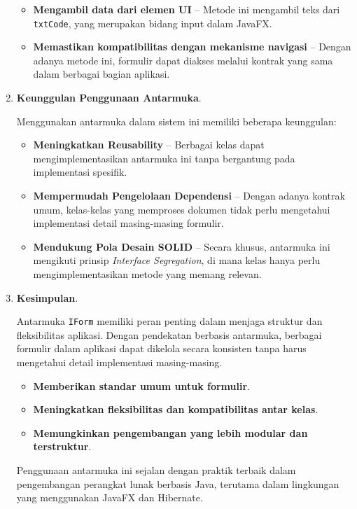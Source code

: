 \begin{enumerate}
	\begin{itemize}
		\item \textbf{Mengambil data dari elemen UI} – Metode ini mengambil teks dari \texttt{txtCode}, yang merupakan bidang input dalam JavaFX.
		\item \textbf{Memastikan kompatibilitas dengan mekanisme navigasi} – Dengan adanya metode ini, formulir dapat diakses melalui kontrak yang sama dalam berbagai bagian aplikasi.
	\end{itemize}
	
	\item \textbf{Keunggulan Penggunaan Antarmuka}.
	
	Menggunakan antarmuka dalam sistem ini memiliki beberapa keunggulan:
	
	\begin{itemize}
		\item \textbf{Meningkatkan Reusability} – Berbagai kelas dapat mengimplementasikan antarmuka ini tanpa bergantung pada implementasi spesifik.
		\item \textbf{Mempermudah Pengelolaan Dependensi} – Dengan adanya kontrak umum, kelas-kelas yang memproses dokumen tidak perlu mengetahui implementasi detail masing-masing formulir.
		\item \textbf{Mendukung Pola Desain SOLID} – Secara khusus, antarmuka ini mengikuti prinsip \textit{Interface Segregation}, di mana kelas hanya perlu mengimplementasikan metode yang memang relevan.
	\end{itemize}
	
	\item \textbf{Kesimpulan}.
	
	Antarmuka \texttt{IForm} memiliki peran penting dalam menjaga struktur dan fleksibilitas aplikasi. Dengan pendekatan berbasis antarmuka, berbagai formulir dalam aplikasi dapat dikelola secara konsisten tanpa harus mengetahui detail implementasi masing-masing.
	
	\begin{itemize}
		\item \textbf{Memberikan standar umum untuk formulir}.
		\item \textbf{Meningkatkan fleksibilitas dan kompatibilitas antar kelas}.
		\item \textbf{Memungkinkan pengembangan yang lebih modular dan terstruktur}.
	\end{itemize}
	
	Penggunaan antarmuka ini sejalan dengan praktik terbaik dalam pengembangan perangkat lunak berbasis Java, terutama dalam lingkungan yang menggunakan JavaFX dan Hibernate.
\end{enumerate}

